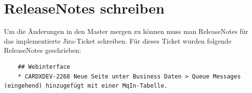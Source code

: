 \section{ReleaseNotes schreiben}
Um die Änderungen in den Master mergen zu können muss man ReleaseNotes für das implementierte Jira-Ticket schreiben. Für dieses Ticket wurden folgende ReleaseNotes geschrieben:

\begin{verbatim}
	## Webinterface
	* CARDXDEV-2268 Neue Seite unter Business Daten > Queue Messages (eingehend) hinzugefügt mit einer MqIn-Tabelle.
\end{verbatim}
\newpage